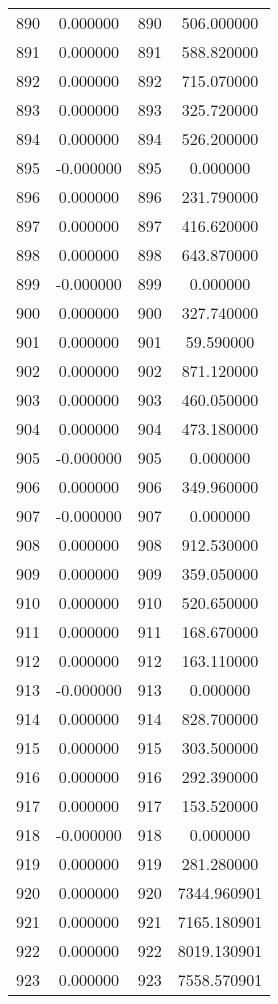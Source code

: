 \documentclass[12pt]{article}
\begin{document}
\begin{longtable}{@{}cccc@{}}
890 & 0.000000 & 890 & 506.000000 \\
891 & 0.000000 & 891 & 588.820000 \\
892 & 0.000000 & 892 & 715.070000 \\
893 & 0.000000 & 893 & 325.720000 \\
894 & 0.000000 & 894 & 526.200000 \\
895 & -0.000000 & 895 & 0.000000 \\
896 & 0.000000 & 896 & 231.790000 \\
897 & 0.000000 & 897 & 416.620000 \\
898 & 0.000000 & 898 & 643.870000 \\
899 & -0.000000 & 899 & 0.000000 \\
900 & 0.000000 & 900 & 327.740000 \\
901 & 0.000000 & 901 & 59.590000 \\
902 & 0.000000 & 902 & 871.120000 \\
903 & 0.000000 & 903 & 460.050000 \\
904 & 0.000000 & 904 & 473.180000 \\
905 & -0.000000 & 905 & 0.000000 \\
906 & 0.000000 & 906 & 349.960000 \\
907 & -0.000000 & 907 & 0.000000 \\
908 & 0.000000 & 908 & 912.530000 \\
909 & 0.000000 & 909 & 359.050000 \\
910 & 0.000000 & 910 & 520.650000 \\
911 & 0.000000 & 911 & 168.670000 \\
912 & 0.000000 & 912 & 163.110000 \\
913 & -0.000000 & 913 & 0.000000 \\
914 & 0.000000 & 914 & 828.700000 \\
915 & 0.000000 & 915 & 303.500000 \\
916 & 0.000000 & 916 & 292.390000 \\
917 & 0.000000 & 917 & 153.520000 \\
918 & -0.000000 & 918 & 0.000000 \\
919 & 0.000000 & 919 & 281.280000 \\
920 & 0.000000 & 920 & 7344.960901 \\
921 & 0.000000 & 921 & 7165.180901 \\
922 & 0.000000 & 922 & 8019.130901 \\
923 & 0.000000 & 923 & 7558.570901 \\

\end{longtable}
\end{document}
